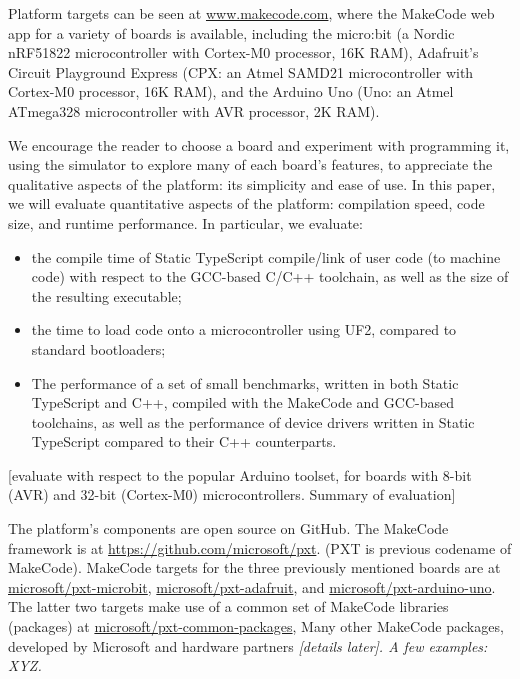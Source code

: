 Platform targets can be seen at \url{www.makecode.com}, where the MakeCode web app for a variety of boards is available, 
including the micro:bit (a Nordic nRF51822 microcontroller with Cortex-M0 processor, 16K RAM), Adafruit's Circuit 
Playground Express (CPX: an Atmel SAMD21 microcontroller with Cortex-M0 processor, 16K RAM), and the Arduino Uno 
(Uno: an Atmel ATmega328 microcontroller with AVR processor, 2K RAM). 

We encourage the reader to choose a board and experiment with programming it, using the simulator to explore many 
of each board's features, to appreciate the qualitative aspects of the platform: its simplicity and ease of use.  In this 
paper, we will evaluate quantitative aspects of the platform: 
compilation speed, code size, and runtime performance.  In particular, we evaluate:
\begin{itemize}
\item the compile time of Static TypeScript compile/link of user code (to machine code) with respect 
      to the GCC-based C/C++ toolchain, as well as the size of the resulting executable;
\item the time to load code onto a microcontroller using UF2, compared to standard bootloaders; 
\item The performance of a set of small benchmarks, written in both Static TypeScript and C++,
      compiled with the MakeCode and GCC-based toolchains, as well as the performance of device drivers
      written in Static TypeScript compared to their C++ counterparts.
\end{itemize}
[evaluate with respect to the popular Arduino toolset, for boards with 8-bit (AVR) and 32-bit (Cortex-M0) microcontrollers. 
Summary of evaluation]

The platform's components are open source on GitHub. The MakeCode framework is at \url{https://github.com/microsoft/pxt}.
(PXT is previous codename of MakeCode). 
MakeCode targets for the three previously mentioned boards are at 
\href{https://github.com/microsoft/pxt-microbit}{microsoft/pxt-microbit}, 
\href{https://github.com/microsoft/pxt-adafruit}{microsoft/pxt-adafruit}, and
\href{https://github.com/microsoft/pxt-arduino-uno}{microsoft/pxt-arduino-uno}.
The latter two targets make use of a common set of MakeCode libraries (packages) at
\href{https://github.com/microsoft/pxt-common-packages}{microsoft/pxt-common-packages},  
Many other MakeCode packages, developed by Microsoft and 
hardware partners \emph{ [details later]. A few examples: XYZ.  }

